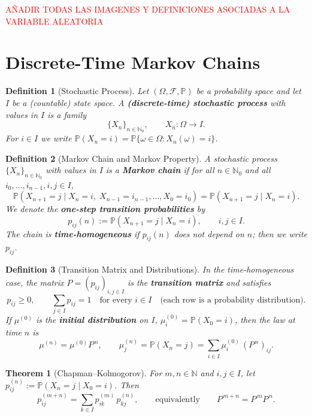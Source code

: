 \documentclass[10pt, oneside]{article}
\newenvironment{theorembox}[1][]{\begin{thmbox}\begin{thm}[#1]}{\end{thm}\end{thmbox}}
\newenvironment{definitionbox}[1][]{\begin{defbox}\begin{defn}[#1]}{\end{defn}\end{defbox}}
\numberwithin{equation}{section}
\newtheorem{thm}{Theorem}[section]
\newtheorem{defn}{Definition}[section]
\begin{document}
\textcolor{red}{AÑADIR TODAS LAS IMAGENES Y DEFINICIONES ASOCIADAS A LA VARIABLE ALEATORIA}{}

\section{Discrete-Time Markov Chains}

\begin{definitionbox}[Stochastic Process]
Let $(\Omega,\mathcal{F},\mathbb{P})$ be a probability space and let $I$ be a (countable) state space.
A \textbf{(discrete-time) stochastic process} with values in $I$ is a family
\[
\{X_n\}_{n\in\mathbb{N}_0}, \qquad X_n:\Omega\to I.
\]
For $i\in I$ we write $\mathbb{P}(X_n=i)=\mathbb{P}\{\omega\in\Omega:X_n(\omega)=i\}$.
\end{definitionbox}

\begin{definitionbox}[Markov Chain and Markov Property]
A stochastic process $\{X_n\}_{n\in\mathbb{N}_0}$ with values in $I$ is a
\textbf{Markov chain} if for all $n\in\mathbb{N}_0$ and all $i_0,\dots,i_{n-1},i,j\in I$,
\[
\mathbb{P}(X_{n+1}=j \mid X_n=i,\; X_{n-1}=i_{n-1},\dots,X_0=i_0)
= \mathbb{P}(X_{n+1}=j \mid X_n=i).
\]
We denote the \textbf{one-step transition probabilities} by
\[
p_{ij}(n) := \mathbb{P}(X_{n+1}=j \mid X_n=i), \qquad i,j\in I.
\]
The chain is \textbf{time-homogeneous} if $p_{ij}(n)$ does not depend on $n$; then we write $p_{ij}$.
\end{definitionbox}

\begin{definitionbox}[Transition Matrix and Distributions]
In the time-homogeneous case, the matrix $P=(p_{ij})_{i,j\in I}$ is the
\textbf{transition matrix} and satisfies
\[
p_{ij}\ge 0,\qquad \sum_{j\in I} p_{ij}=1 \quad \text{for every } i\in I
\quad\text{(each row is a probability distribution).}
\]
If $\mu^{(0)}$ is the \textbf{initial distribution} on $I$, $\mu^{(0)}_i=\mathbb{P}(X_0=i)$,
then the law at time $n$ is
\[
\mu^{(n)} = \mu^{(0)} P^{\,n}, \qquad
\mu^{(n)}_j=\mathbb{P}(X_n=j)=\sum_{i\in I}\mu^{(0)}_i\, (P^{\,n})_{ij}.
\]
\end{definitionbox}

\begin{theorembox}[Chapman–Kolmogorov]
For $m,n\in\mathbb{N}$ and $i,j\in I$, let
$p^{(n)}_{ij}:=\mathbb{P}(X_n=j\mid X_0=i)$.
Then
\[
p^{(m+n)}_{ij}=\sum_{k\in I} p^{(m)}_{ik}\, p^{(n)}_{kj},
\qquad\text{equivalently}\qquad P^{\,m+n}=P^{\,m}P^{\,n}.
\]
\end{theorembox}
\end{document}
